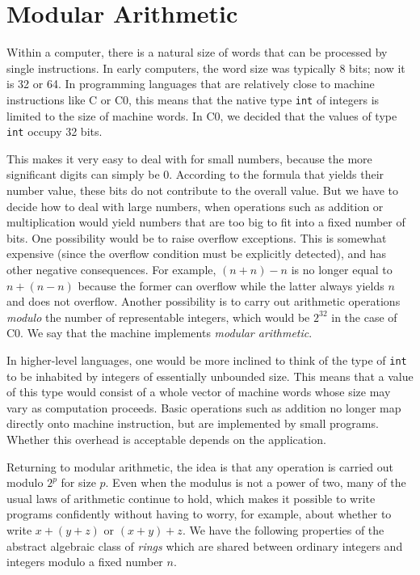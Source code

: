 \section{Modular Arithmetic}
\label{sec:ints:modarith}

Within a computer, there is a natural size of words that can be
processed by single instructions.  In early computers, the word size
was typically 8 bits; now it is 32 or 64.  In programming languages
that are relatively close to machine instructions like C or C0, this means
that the native type \lstinline'int' of integers is limited to the size
of machine words.  In C0, we decided that the values of type
\lstinline'int' occupy 32 bits.

This makes it very easy to deal with for small numbers, because the
more significant digits can simply be 0.  According to the formula
that yields their number value, these bits do not contribute to the
overall value.  But we have to decide how to deal with large numbers,
when operations such as addition or multiplication would yield numbers
that are too big to fit into a fixed number of bits.  One possibility
would be to raise overflow exceptions.  This is somewhat expensive
(since the overflow condition must be explicitly detected), and has
other negative consequences.  For example, $(n + n) - n$ is no longer
equal to $n + (n - n)$ because the former can overflow while the
latter always yields $n$ and does not overflow.  Another possibility
is to carry out arithmetic operations \emph{modulo} the number of
representable integers, which would be $2^{32}$ in the case of C0.  We
say that the machine implements \emph{modular arithmetic}.

In higher-level languages, one would be more inclined to think
of the type of \lstinline'int' to be inhabited by integers of essentially
unbounded size.  This means that a value of this type would consist
of a whole vector of machine words whose size may vary as computation
proceeds.  Basic operations such as addition no longer map directly
onto machine instruction, but are implemented by small programs.
Whether this overhead is acceptable depends on the application.

Returning to modular arithmetic, the idea is that any operation
is carried out modulo $2^p$ for size $p$.  Even when
the modulus is not a power of two, many of the usual laws of
arithmetic continue to hold, which makes it possible to write
programs confidently without having to worry, for example,
about whether to write $x+(y+z)$ or $(x+y)+z$.  We have the
following properties of the abstract algebraic class of
\emph{rings} which are shared between ordinary integers and
integers modulo a fixed number $n$.

